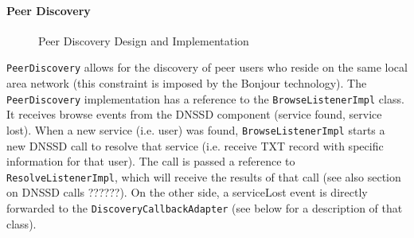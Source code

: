 \paragraph{Peer Discovery}
\begin{figure}[H]
 \centering
 \caption{Peer Discovery Design and Implementation}
 \label{fig:network.discovery.peerdiscovery}
\end{figure}

\texttt{PeerDiscovery} allows for the discovery of peer users who reside on the same local area network (this constraint is   imposed by the Bonjour technology). The \texttt{PeerDiscovery} implementation has a reference to the \texttt{BrowseListenerImpl} class. It receives browse events from the DNSSD component (service found, service lost). When a new service (i.e. user) was found, \texttt{BrowseListenerImpl} starts a new DNSSD call to resolve that service (i.e. receive TXT record with specific information for that user). The call is passed a reference to \texttt{ResolveListenerImpl}, which will receive the results of that call (see also section on DNSSD calls ??????). On the other side, a serviceLost event is directly forwarded to the \texttt{DiscoveryCallbackAdapter} (see below for a description of that class). 

